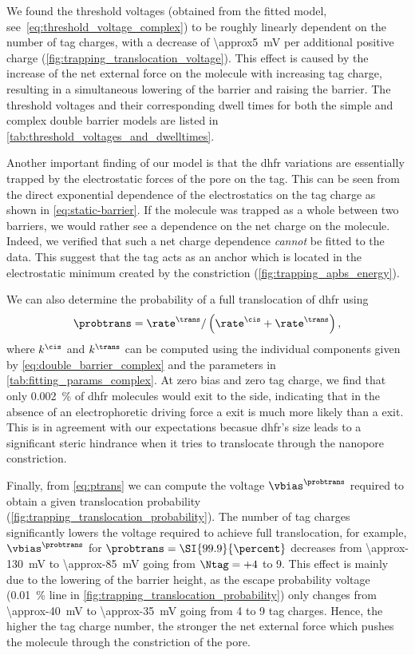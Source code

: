We found the threshold voltages (obtained from the fitted model, see~\cref{eq:threshold_voltage_complex}) to
be roughly linearly dependent on the number of tag charges, with a decrease of \SI{\approx5}{\mV} per
additional positive charge (\cref{fig:trapping_translocation_voltage}). This effect is caused by the increase
of the net external force on the molecule with increasing tag charge, resulting in a simultaneous lowering of
the \transi{} barrier and raising the \cisi{} barrier. The threshold voltages and their corresponding
dwell times for both the simple and complex double barrier models are listed in
\cref{tab:threshold_voltages_and_dwelltimes}.

Another important finding of our model is that the \gls{dhfr} variations are essentially trapped by the
electrostatic forces of the pore on the tag. This can be seen from the direct exponential dependence of the
electrostatics on the tag charge as shown in \cref{eq:static-barrier}. If the molecule was trapped as a whole
between two barriers, we would rather see a dependence on the net charge on the molecule. Indeed, we verified
that such a net charge dependence \emph{cannot} be fitted to the data. This suggest that the tag acts as an
anchor which is located in the electrostatic minimum created by the \transi{} constriction
(\cref{fig:trapping_apbs_energy}).

We can also determine the probability of a full translocation of \gls{dhfr} using
%
\begin{align}\label{eq:ptrans}
  \probtrans = \rate^{\trans} / \left( \rate^{\cis} + \rate^{\trans} \right),
\end{align}
%
where $k^\cis$ and $k^\trans$ can be computed using the individual components given by
\cref{eq:double_barrier_complex} and the parameters in \cref{tab:fitting_params_complex}. At zero bias and
zero tag charge, we find that only \SI{0.002}{\percent} of \gls{dhfr} molecules would exit to the \transi{}
side, indicating that in the absence of an electrophoretic driving force a \cisi{} exit is much more likely
than a \transi{} exit. This is in agreement with our expectations becasue \gls{dhfr}'s size leads to a
significant steric hindrance when it tries to translocate through the nanopore constriction.

Finally, from \cref{eq:ptrans} we can compute the voltage $\vbias^{\probtrans}$ required to obtain a given
translocation probability (\cref{fig:trapping_translocation_probability}). The number of tag charges
significantly lowers the voltage required to achieve full translocation, for example, $\vbias^{\probtrans}$
for $\probtrans = \SI{99.9}{\percent}$ decreases from \SI{\approx-130}{\mV} to \SI{\approx-85}{\mV} going from
$\Ntag = +4$ to \num{+9}. This effect is mainly due to the lowering of the \transi{} barrier height, as the
\cisi{} escape probability voltage (\SI{0.01}{\percent} line in \cref{fig:trapping_translocation_probability})
only changes from \SI{\approx-40}{\mV} to \SI{\approx-35}{\mV} going from \num{+4} to \num{+9} tag charges.
Hence, the higher the tag charge number, the stronger the net external force which pushes the molecule through
the \transi{} constriction of the pore.

